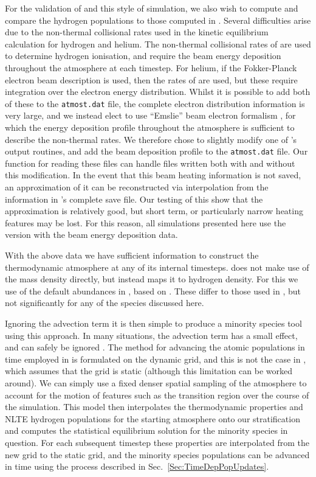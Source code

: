 For the validation of \Lw{} and this style of simulation, we also wish to compute and compare the hydrogen populations to those computed in \Radyn{}.
Several difficulties arise due to the non-thermal collisional rates used in the kinetic equilibrium calculation for hydrogen and helium.
The non-thermal collisional rates of \citet{1993Fang} are used to determine hydrogen ionisation, and require the beam energy deposition throughout the atmosphere at each timestep.
For helium, if the Fokker-Planck electron beam description is used, then the rates of \citet{Arnaud1985} are used, but these require integration over the electron energy distribution.
Whilst it is possible to add both of these to the \texttt{atmost.dat} file, the complete electron distribution information is very large, and we instead elect to use ``Emslie'' beam electron formalism \citep{Emslie1978}, for which the energy deposition profile throughout the atmosphere is sufficient to describe the non-thermal rates.
We therefore chose to slightly modify one of \Radyn{}'s output routines, and add the beam deposition profile to the \texttt{atmost.dat} file.
Our function for reading these files can handle files written both with and without this modification.
In the event that this beam heating information is not saved, an approximation of it can be reconstructed via interpolation from the information in \Radyn{}'s complete save file.
Our testing of this show that the approximation is relatively good, but short term, or particularly narrow heating features may be lost.
For this reason, all simulations presented here use the version with the beam energy deposition data.

With the above data we have sufficient information to construct the \Radyn{} thermodynamic atmosphere at any of its internal timesteps.
\Lw{} does not make use of the mass density directly, but instead maps it to hydrogen density.
For this we use of the default abundances in \Lw{}, based on \citet{Asplund2009}.
These differ to those used in \Radyn{}, but not significantly for any of the species discussed here.

Ignoring the advection term it is then simple to produce a minority species tool using this approach.
In many situations, the advection term has a small effect, and can safely be ignored \citep{Kasparova2003,Nejezchleba1998}.
The method for advancing the atomic populations in time employed in \Radyn{} is formulated on the dynamic grid, and this is not the case in \Lw{}, which assumes that the grid is static (although this limitation can be worked around).
We can simply use a fixed denser spatial sampling of the atmosphere to account for the motion of features such as the transition region over the course of the simulation.
This model then interpolates the thermodynamic properties and NLTE hydrogen populations for the starting atmosphere onto our stratification and computes the statistical equilibrium solution for the minority species in question.
For each subsequent timestep these properties are interpolated from the new \Radyn{} grid to the static grid, and the minority species populations can be advanced in time using the process described in Sec.~\ref{Sec:TimeDepPopUpdates}.

